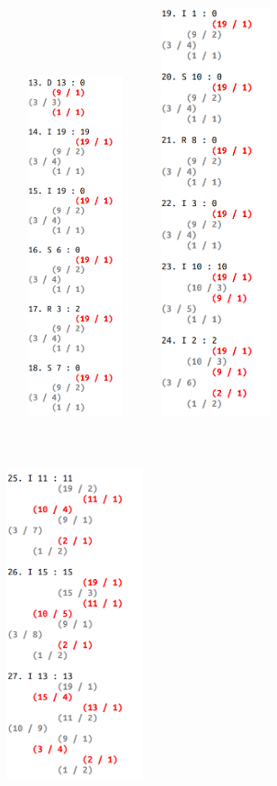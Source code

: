 \documentclass[12pt]{article}
\begin{document}
\begin{figure}[h!]
\begin{center}
		\includegraphics[width=4cm, height=10cm]{pic/test2-3.png}
		\includegraphics[width=4cm, height=12cm]{pic/test2-4.png}
		\includegraphics[width=4cm, height=12cm]{pic/test2-5.png}

\end{center}
\end{figure}
\end{document}
